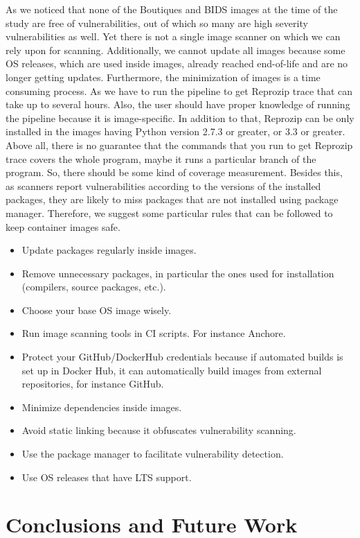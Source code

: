 \documentclass[a4paper,num-refs]{oup-contemporary}
\begin{document}
As we noticed that none of the Boutiques and BIDS images at the time of the study are free of vulnerabilities, out of which
so many are high severity vulnerabilities as well. Yet there is not a single image scanner on which we can rely upon for
scanning. Additionally, we cannot update all images because some OS releases, which are used inside images, 
already reached end-of-life and are
no longer getting updates. Furthermore, the minimization of images is a time consuming process. As we have to run
the pipeline to get Reprozip trace that can take up to several hours. Also, the user should have proper knowledge
of running the pipeline because it is image-specific. In addition to that, Reprozip can be only installed
in the images having Python version 2.7.3 or greater, or 3.3 or greater. Above all, there is no guarantee that
the commands that you run to get Reprozip trace covers the whole program, maybe it runs a particular
branch of the program. So, there should be some kind of coverage measurement.
Besides this, as scanners report vulnerabilities according to the versions of the installed packages,
they are likely to miss packages that are not installed using package manager. 
Therefore, we suggest some particular rules that can be
followed to keep container images safe.
\begin{itemize}
	\item Update packages regularly inside images.
	\item Remove unnecessary packages, in particular the ones used for installation (compilers, source packages, etc.).
	\item Choose your base OS image wisely.
	\item Run image scanning tools in CI scripts. For instance Anchore.
	\item Protect your GitHub/DockerHub credentials because if automated builds is set up
in Docker Hub, it can automatically build images from external repositories, for instance GitHub.
\item Minimize dependencies inside images.
\item Avoid static linking because it obfuscates vulnerability scanning.
\item Use the package manager to facilitate vulnerability detection.
\item Use OS releases that have LTS support.
\end{itemize}
\vspace*{-2mm}
\section{Conclusions and Future Work}
\end{document}
